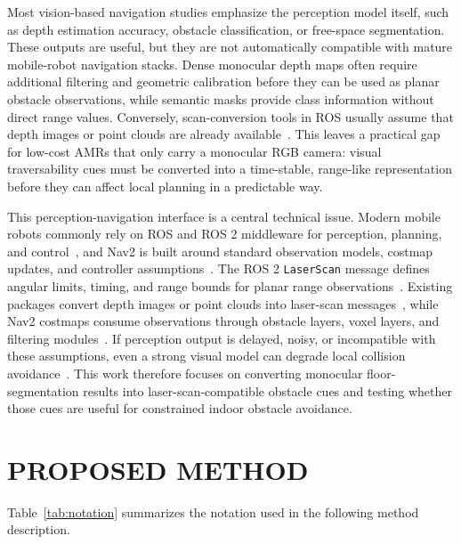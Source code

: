 \documentclass{IJCAS}
\begin{document}
Most vision-based navigation studies emphasize the perception model itself, such as depth estimation accuracy, obstacle classification, or free-space segmentation. These outputs are useful, but they are not automatically compatible with mature mobile-robot navigation stacks. Dense monocular depth maps often require additional filtering and geometric calibration before they can be used as planar obstacle observations, while semantic masks provide class information without direct range values. Conversely, scan-conversion tools in ROS usually assume that depth images or point clouds are already available~\cite{openrobotics_2020_depthimage_to_laserscan,openrobotics_2015_pointcloud_to_laserscan}. This leaves a practical gap for low-cost AMRs that only carry a monocular RGB camera: visual traversability cues must be converted into a time-stable, range-like representation before they can affect local planning in a predictable way.

This perception-navigation interface is a central technical issue. Modern mobile robots commonly rely on ROS and ROS 2 middleware for perception, planning, and control~\cite{quigley_2009_ros,macenski_2022_robot}, and Nav2 is built around standard observation models, costmap updates, and controller assumptions~\cite{macenski_2020_the,macenski_2023_from}. The ROS 2 \texttt{LaserScan} message defines angular limits, timing, and range bounds for planar range observations~\cite{openrobotics_sensor_msgslaserscan}. Existing packages convert depth images or point clouds into laser-scan messages~\cite{openrobotics_2020_depthimage_to_laserscan,openrobotics_2015_pointcloud_to_laserscan}, while Nav2 costmaps consume observations through obstacle layers, voxel layers, and filtering modules~\cite{opennavigationllc_2023_costmap,opennavigationllc_2025_denoise}. If perception output is delayed, noisy, or incompatible with these assumptions, even a strong visual model can degrade local collision avoidance~\cite{fox_1997_the}. This work therefore focuses on converting monocular floor-segmentation results into laser-scan-compatible obstacle cues and testing whether those cues are useful for constrained indoor obstacle avoidance.

\section{PROPOSED METHOD}\label{sec3}

Table~\ref{tab:notation} summarizes the notation used in the following method description.
\end{document}

